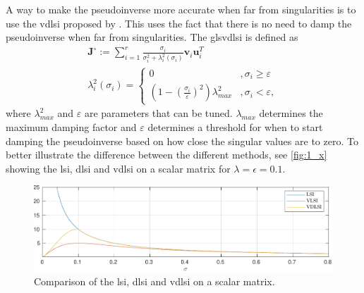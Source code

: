 A way to make the pseudoinverse more accurate when far from singularities is to
use the \gls{vdlsi} proposed by \cite{chiaverini1997}.
This uses the fact that there is no need to damp the pseudoinverse when far from singularities.
The gls{vdlsi} is defined as
\begin{subequations}
\begin{align}
    \bm{J}^{\circ} := \sum_{i=1}^r \frac{\sigma_i}{\sigma_i^2 + \lambda_i^2(\sigma_i)} \bm{v}_i \bm{u}_i^T \\
    \lambda_i^2(\sigma_i) = \begin{cases}
        0 & ,\sigma_i \geq \varepsilon \\
        \left(1-\left(\frac{\sigma_i}{\varepsilon}\right)^2\right)\lambda_{max}^2 & ,\sigma_i < \varepsilon,
    \end{cases}
\end{align}
\end{subequations}
where $\lambda_{max}^2$ and $\varepsilon$ are parameters that can be tuned. $\lambda_{max}$
determines the maximum damping factor and $\varepsilon$ determines a threshold for when
to start damping the pseudoinverse based on how close the singular values are to zero.
To better illustrate the difference between the different methods, see \autoref{fig:1_x}
showing the \gls{lsi}, \gls{dlsi} and \gls{vdlsi} on a scalar matrix for $\lambda=\epsilon=0.1$.

\begin{figure}[h]
    \centering
    \includegraphics[width=\textwidth]{assets/singval.pdf}
    \caption{Comparison of the \gls{lsi}, \gls{dlsi} and \gls{vdlsi} on a scalar matrix.}
    \label{fig:1_x}
\end{figure}



